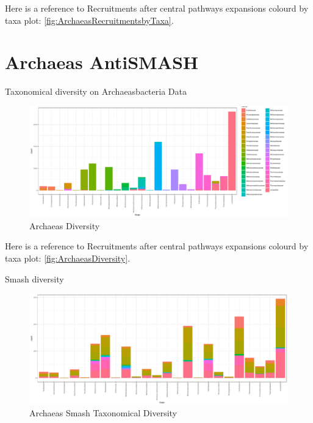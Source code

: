 \documentclass[12pt,twoside]{reedthesis}
\begin{document}
  Here is a reference to Recruitments after central pathways expansions
  colourd by taxa plot: \autoref{fig:ArchaeasRecruitmentsbyTaxa}.
  \clearpage 
  
  \section{Archaeas AntiSMASH}\label{archaeas-antismash}
  
  Taxonomical diversity on Archaeasbacteria Data
  
  \begin{figure}[h!tbp]
  \centering
  \includegraphics[angle = 0,scale = 0.6]{chapter3/ArchaeasDiversity.pdf}
  \caption[Archaeas Diversity]{\normalsize{Archaeas Diversity}}
  \label{fig:ArchaeasDiversity}
  \end{figure}
  
  Here is a reference to Recruitments after central pathways expansions
  colourd by taxa plot: \autoref{fig:ArchaeasDiversity}. \clearpage
  
  Smash diversity
  
  \begin{figure}[h!tbp]
  \centering
  \includegraphics[angle = 0,scale = 0.5]{chapter3/ArchaeasSmash.pdf}
  \caption[Archaeas Smash Taxonomical Diversity]{\normalsize{Archaeas Smash Taxonomical Diversity}}
  \label{fig:ArchaeasSmash}
  \end{figure}
  
\end{document}
